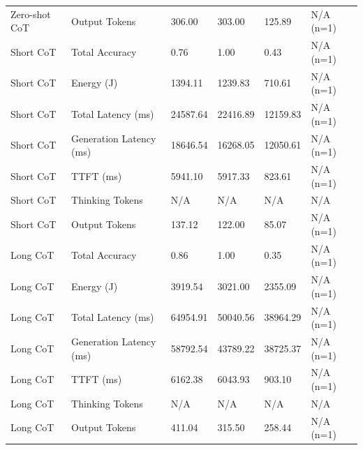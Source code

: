 \begin{table}
\begin{tabular}{llllll}
Zero-shot CoT & Output Tokens & 306.00 & 303.00 & 125.89 & N/A (n=1) \\
Short CoT & Total Accuracy & 0.76 & 1.00 & 0.43 & N/A (n=1) \\
Short CoT & Energy (J) & 1394.11 & 1239.83 & 710.61 & N/A (n=1) \\
Short CoT & Total Latency (ms) & 24587.64 & 22416.89 & 12159.83 & N/A (n=1) \\
Short CoT & Generation Latency (ms) & 18646.54 & 16268.05 & 12050.61 & N/A (n=1) \\
Short CoT & TTFT (ms) & 5941.10 & 5917.33 & 823.61 & N/A (n=1) \\
Short CoT & Thinking Tokens & N/A & N/A & N/A & N/A \\
Short CoT & Output Tokens & 137.12 & 122.00 & 85.07 & N/A (n=1) \\
Long CoT & Total Accuracy & 0.86 & 1.00 & 0.35 & N/A (n=1) \\
Long CoT & Energy (J) & 3919.54 & 3021.00 & 2355.09 & N/A (n=1) \\
Long CoT & Total Latency (ms) & 64954.91 & 50040.56 & 38964.29 & N/A (n=1) \\
Long CoT & Generation Latency (ms) & 58792.54 & 43789.22 & 38725.37 & N/A (n=1) \\
Long CoT & TTFT (ms) & 6162.38 & 6043.93 & 903.10 & N/A (n=1) \\
Long CoT & Thinking Tokens & N/A & N/A & N/A & N/A \\
Long CoT & Output Tokens & 411.04 & 315.50 & 258.44 & N/A (n=1) \\
\bottomrule
\end{tabular}
\end{table}

